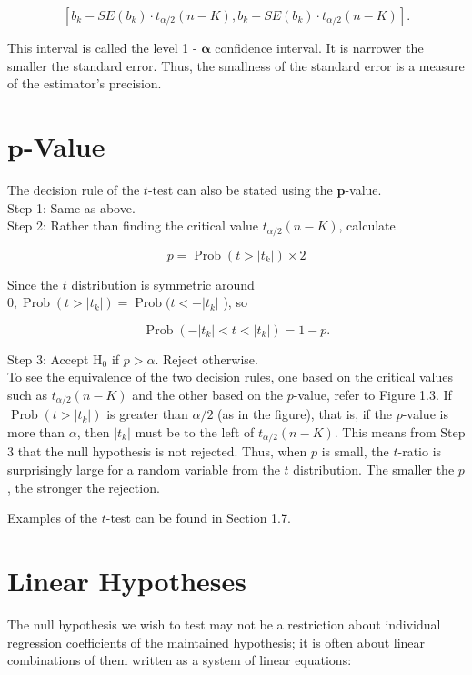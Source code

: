 \documentclass[10pt]{article}
\begin{document}
\begin{equation*}
\left[b_{k}-S E\left(b_{k}\right) \cdot t_{\alpha / 2}(n-K), b_{k}+S E\left(b_{k}\right) \cdot t_{\alpha / 2}(n-K)\right] . \tag{1.4.6}
\end{equation*}


This interval is called the level 1 - $\boldsymbol{\alpha}$ confidence interval. It is narrower the smaller the standard error. Thus, the smallness of the standard error is a measure of the estimator's precision.

\section*{$\boldsymbol{p}$-Value}
The decision rule of the $t$-test can also be stated using the $\boldsymbol{p}$-value.\\
Step 1: Same as above.\\
Step 2: Rather than finding the critical value $t_{\alpha / 2}(n-K)$, calculate

$$
p=\operatorname{Prob}\left(t>\left|t_{k}\right|\right) \times 2
$$

Since the $t$ distribution is symmetric around $0, \operatorname{Prob}\left(t>\left|t_{k}\right|\right)=\operatorname{Prob}(t< -\left|t_{k}\right|$ ), so


\begin{equation*}
\operatorname{Prob}\left(-\left|t_{k}\right|<t<\left|t_{k}\right|\right)=1-p . \tag{1.4.7}
\end{equation*}


Step 3: Accept $\mathrm{H}_{0}$ if $p>\alpha$. Reject otherwise.\\
To see the equivalence of the two decision rules, one based on the critical values such as $t_{\alpha / 2}(n-K)$ and the other based on the $p$-value, refer to Figure 1.3. If $\operatorname{Prob}\left(t>\left|t_{k}\right|\right)$ is greater than $\alpha / 2$ (as in the figure), that is, if the $p$-value is more than $\alpha$, then $\left|t_{k}\right|$ must be to the left of $t_{\alpha / 2}(n-K)$. This means from Step 3 that the null hypothesis is not rejected. Thus, when $p$ is small, the $t$-ratio is surprisingly large for a random variable from the $t$ distribution. The smaller the $p$, the stronger the rejection.

Examples of the $t$-test can be found in Section 1.7.

\section*{Linear Hypotheses}
The null hypothesis we wish to test may not be a restriction about individual regression coefficients of the maintained hypothesis; it is often about linear combinations of them written as a system of linear equations:
\end{document}
